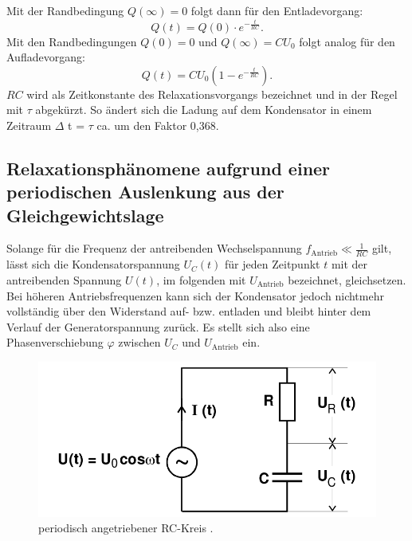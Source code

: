 Mit der Randbedingung $ Q(\infty)=0$ folgt dann für den Entladevorgang:
\begin{equation}
  Q(t) = Q(0) \cdot e^{-\frac{t}{RC}}\text{.}
\end{equation}
Mit den Randbedingungen $Q(0) = 0 $ und $Q(\infty) = CU_0$ folgt analog für
den Aufladevorgang:
\begin{equation}
  Q(t) = CU_0 \left(1-e^{-\frac{t}{RC}}\right)\text{.}
\end{equation}
$RC$ wird als Zeitkonstante des Relaxationsvorgangs bezeichnet und in der Regel mit
 $\tau$ abgekürzt. So ändert sich die Ladung auf dem Kondensator in einem Zeitraum
 $\Delta$ t = $\tau$ ca. um den Faktor 0,368.

 \subsection{Relaxationsphänomene aufgrund einer periodischen Auslenkung aus der Gleichgewichtslage}

 Solange für die Frequenz der antreibenden Wechselspannung $ f_{\text{Antrieb}} \ll \frac{1}{RC} $ gilt, lässt sich die Kondensatorspannung
 $U_C(t)$ für jeden Zeitpunkt $t$ mit der antreibenden Spannung $U(t)$, im folgenden mit $U_{\text{Antrieb}}$ bezeichnet, gleichsetzen. Bei höheren Antriebsfrequenzen
 kann sich der Kondensator jedoch nichtmehr vollständig über den Widerstand
  auf- bzw. entladen und bleibt hinter dem Verlauf der Generatorspannung zurück.
  Es stellt sich also eine Phasenverschiebung $\varphi$ zwischen $U_C$ und $U_{\text{Antrieb}}$ ein.

\begin{figure}[H]
  \centering

  \includegraphics[width=\linewidth-200pt,height=\textheight-200pt,keepaspectratio]{content/RC_Kreis2.png}
  \caption{periodisch angetriebener RC-Kreis \cite{V353}.}
  \label{fig:RC_Kreis2}
\end{figure}

